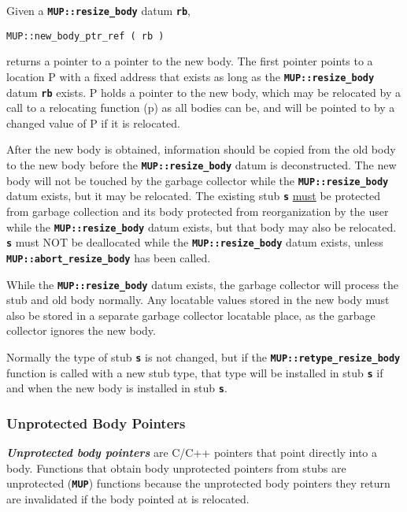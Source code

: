 \documentclass[12pt]{article}
\newcommand{\TT}[1]{{\tt \bfseries #1}}
\newcommand{\ikey}[2]{{\bf \em #1}\index{#2}}
\newcommand{\pagref}[1]{p\pageref{#1}}
\newcommand{\EOL}{\penalty \exhyphenpenalty}
\begin{document}
Given a \TT{MUP::\EOL resize\_\EOL body} datum \TT{rb},
\begin{center}
\verb|MUP::new_body_ptr_ref ( rb )|
\end{center}
returns a pointer to a pointer to the new body.  The first pointer
points to a location P with a fixed address that exists as long
as the \TT{MUP::\EOL resize\_\EOL body} datum \TT{rb} exists.   P holds
a pointer to the new body, which may be relocated by a call to
a relocating function (\pagref{RELOCATING-FUNCTIONS})
as all bodies
can be, and will be pointed to by a changed value of P if it is
relocated.

After the new body is obtained, information should be copied from
the old body to the new body before the \TT{MUP::\EOL resize\_\EOL body}
datum is deconstructed.  The new body will not be touched by
the garbage collector while the \TT{MUP::\EOL resize\_\EOL body} datum
exists, but it may be relocated.  The existing stub \TT{s}
\underline{must} be protected from garbage collection and
its body protected from reorganization by the user while the
\TT{MUP::\EOL resize\_\EOL body} datum exists, but that body may
also be relocated.  \TT{s} must NOT be deallocated
while the \TT{MUP::\EOL resize\_\EOL body} datum exists, unless
\TT{MUP::\EOL abort\_\EOL resize\_\EOL body} has been called.

While the \TT{MUP::\EOL resize\_\EOL body} datum exists,
the garbage collector will process the stub and old body normally.
Any locatable values stored in the new body must also be stored
in a separate garbage collector locatable place, as the garbage collector
ignores the new body.

Normally the type of stub \TT{s} is not changed, but
if the \TT{MUP::\EOL retype\_\EOL resize\_\EOL body} function is called
with a new stub type, that type will be installed in stub \TT{s}
if and when the new body is installed in stub \TT{s}.

\subsubsection{Unprotected Body Pointers}
\label{UNPROTECTED-BODY-POINTERS}

\ikey{Unprotected body pointers}{unprotected body pointer}%
are C/C++ pointers that point directly into a body.
Functions that obtain body unprotected
pointers from stubs are unprotected (\TT{MUP}) functions because
the unprotected body pointers they return are invalidated
if the body pointed at
is relocated.
\end{document}
